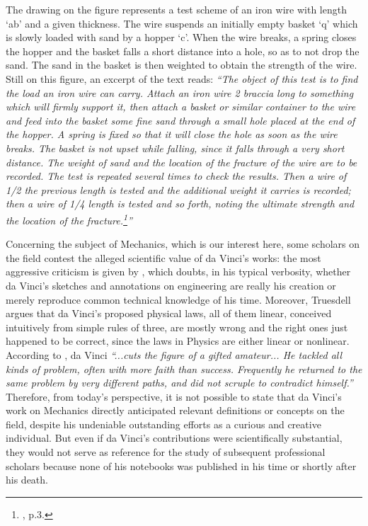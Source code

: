 The drawing on the figure represents a test scheme of an iron wire with length `ab' and a given thickness. The wire suspends an initially empty basket `q' which is slowly loaded with sand by a hopper `c'. When the wire breaks, a spring closes the hopper and the basket falls a short distance into a hole, so as to not drop the sand. The sand in the basket is then weighted to obtain the strength of the wire. Still on this figure, an excerpt of the text reads: \emph{``The object of this test is to find the load an iron wire can carry. Attach an iron wire 2 braccia long to something which will firmly support it, then attach a basket or similar container to the wire and feed into the basket some fine sand through a small hole placed at the end of the hopper. A spring is fixed so that it will close the hole as soon as the wire breaks. The basket is not upset while falling, since it falls through a very short distance. The weight of sand and the location of the fracture of the wire are to be recorded. The test is repeated several times to check the results. Then a wire of 1/2 the previous length is tested and the additional weight it carries is recorded; then a wire of 1/4 length is tested and so forth, noting the ultimate strength and the location of the fracture.\footnote{\cite{lund_2000_1}, p.3.}''}       


Concerning the subject of Mechanics, which is our interest here, some scholars on the field contest the alleged scientific value of da Vinci's works: the most aggressive criticism is given by \cite{truesdell_1968}, which doubts, in his typical verbosity, whether da Vinci's sketches and annotations on engineering are really his creation or merely reproduce common technical knowledge of his time. Moreover, Truesdell argues that da Vinci's proposed physical laws, all of them linear, conceived intuitively from simple rules of three, are mostly wrong and the right ones just happened to be correct, since the laws in Physics are either linear or nonlinear. According to \cite{dugas_1988_1}, da Vinci \emph{``...cuts the figure of a gifted amateur... He tackled all kinds of problem, often with more faith than success. Frequently he returned to the same problem by very different paths, and did not scruple to contradict himself.''} Therefore, from today's perspective, it is not possible to state that da Vinci's work on Mechanics directly anticipated relevant definitions or concepts on the field, despite his undeniable outstanding efforts as a curious and creative individual. But even if da Vinci's contributions were scientifically substantial, they would not serve as reference for the study of subsequent professional scholars because none of his notebooks was published in his time or shortly after his death.  


